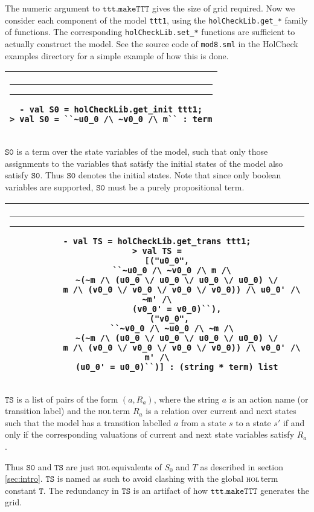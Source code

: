 \documentclass{article}
\makeatletter
\newcommand{\hol}{\textsc{hol\,}}
\newlength{\hsbw}
\newcounter{sessioncount}
\newcommand\MLSpacing{13pt}
\newenvironment{session}{\begin{flushleft}
 \begin{tabular}{@{}|c@{}|@{}}\hline 
 \begin{minipage}[b]{\hsbw}
 \vspace*{-.5pt}
 \begin{flushright}
 \rule{0.01in}{.15in}\rule{0.3in}{0.01in}\hspace{-0.35in}
 \raisebox{0.04in}{\makebox[0.3in][c]{\footnotesize\sl \thesessioncount}}
 \end{flushright}
 \vspace*{-.45in}
 \begingroup\small\baselineskip\MLSpacing}{\endgroup\end{minipage}\\ \hline 
 \end{tabular}
 \end{flushleft}
 \stepcounter{sessioncount}}
\makeatother
\begin{document}
The numeric argument to \(\mathtt{ttt.makeTTT}\) gives the size of grid required.  Now we consider each component of the model \texttt{ttt1}, using the \texttt{holCheckLib.get\_*} family of functions. The corresponding \texttt{holCheckLib.set\_*} functions are sufficient to actually construct the model. See the source code of \texttt{mod8.sml} in the HolCheck examples directory for a simple example of how this is done.

\begin{session}\begin{verbatim}
- val S0 = holCheckLib.get_init ttt1;
> val S0 = ``~u0_0 /\ ~v0_0 /\ m`` : term
\end{verbatim}\end{session}

\(\mathtt{S0}\) is a term over the state variables of the model, such that only those assignments to the variables that satisfy the initial states of the model also satisfy \(\mathtt{S0}\). Thus \(\mathtt{S0}\) denotes the initial states. Note that since only boolean variables are supported, \(\mathtt{S0}\) must be a purely propositional term.

\begin{session}\begin{verbatim}
- val TS = holCheckLib.get_trans ttt1;
> val TS =
    [("u0_0",
      ``~u0_0 /\ ~v0_0 /\ m /\
        ~(~m /\ (u0_0 \/ u0_0 \/ u0_0 \/ u0_0) \/
          m /\ (v0_0 \/ v0_0 \/ v0_0 \/ v0_0)) /\ u0_0' /\ ~m' /\
        (v0_0' = v0_0)``),
     ("v0_0",
      ``~v0_0 /\ ~u0_0 /\ ~m /\
        ~(~m /\ (u0_0 \/ u0_0 \/ u0_0 \/ u0_0) \/
          m /\ (v0_0 \/ v0_0 \/ v0_0 \/ v0_0)) /\ v0_0' /\ m' /\
        (u0_0' = u0_0)``)] : (string * term) list
\end{verbatim}\end{session}

\(\mathtt{TS}\) is a list of pairs of the form \( (a,R_a)\), where the string \(a\) is an action name (or transition label) and the \hol term \(R_a\) is a relation over current and next states such that the model has a transition labelled \(a\) from a state \( s \) to a state \(s'\) if and only if the corresponding valuations of current and next state variables satisfy \( R_a \). 

Thus \(\mathtt{S0}\) and \(\mathtt{TS}\) are just \hol equivalents of \(S_0\) and \(T\) as described in section \ref{sec:intro}. \( \mathtt{TS} \) is named as such to avoid clashing with the global \hol term constant \( \mathtt{T} \). The redundancy in \(\mathtt{TS}\) is an artifact of how  \(\mathtt{ttt.makeTTT}\) generates the grid.
\end{document}
